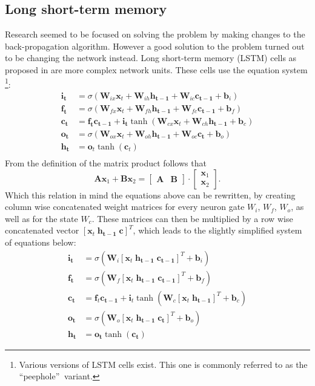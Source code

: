 \subsection{Long short-term memory}
Research seemed to be focused on solving the problem by making changes to the back-propagation algorithm. However a good solution to the problem turned out to
be changing the network instead. Long short-term memory (LSTM) cells as proposed in \cite{Hochreiter1995} are more complex network units.
These cells use the equation system \cite[page 5]{Graves2013}\footnote{ Various versions of LSTM cells exist. This one is commonly referred to as the \textquotedblleft peephole\textquotedblright $ \: $ variant. }:
\begin{align}
\mathbf{i_t} &= \sigma (\mathbf{W}_{ix} \mathbf{x}_t + \mathbf{W}_{ih} \mathbf{h_{t-1}} + \mathbf{W}_{ic} \mathbf{c_{t-1}} +\mathbf{ b}_i) \\
\mathbf{f_t} &= \sigma (\mathbf{W}_{fx} \mathbf{x}_t + \mathbf{W}_{fh} \mathbf{h_{t-1}} + \mathbf{W}_{fc} \mathbf{c_{t-1}} +\mathbf{ b}_f) \\
\mathbf{c_t} &= \mathbf{f_t} \mathbf{c_{t-1}} + \mathbf{i_t} \tanh( \mathbf{W}_{cx} \mathbf{x}_t + \mathbf{W}_{ch} \mathbf{h_{t-1}} + \mathbf{b}_c ) \\
\mathbf{o_t} &= \sigma (\mathbf{W}_{ox} \mathbf{x}_t + \mathbf{W}_{oh} \mathbf{h_{t-1}} + \mathbf{W}_{oc} \mathbf{c_t} + \mathbf{b}_o ) \\
\mathbf{h_t} &= \mathbf{o}_t \tanh(\mathbf{c}_t) \\
\end{align}
From the definition of the matrix product follows that
\begin{equation}
\mathbf{A}\mathbf{x}_1 + \mathbf{B}\mathbf{x}_2
=
\begin{bmatrix} \mathbf{A} & \mathbf{B} \end{bmatrix} \cdot
\begin{bmatrix} \mathbf{x}_1 \\ \mathbf{x}_2 \end{bmatrix}.
\end{equation}
Which this relation in mind the equations above can be rewritten, by creating column wise concatenated weight matrices for every neuron gate $W_i$, $W_f$, $W_o$, as well as for the state $W_c$. These matrices can then be multiplied by a row wise concatenated vector $[\mathbf{x}_t \; \mathbf{h_{t-1}} \; \mathbf{c}]^T$, which leads to the slightly simplified system of equations below:
\begin{align}
\mathbf{i_t} &= \sigma (\mathbf{W}_i [\mathbf{x}_t \; \mathbf{h_{t-1}} \; \mathbf{c_{t-1}}]^T + \mathbf{b}_i) \\
\mathbf{f_t} &= \sigma (\mathbf{W}_f [\mathbf{x}_t \; \mathbf{h_{t-1}} \; \mathbf{c_{t-1}}]^T + \mathbf{b}_f) \\
\mathbf{c_t} &= \mathbf{f}_t \mathbf{c_{t-1}} + \mathbf{i}_t \tanh( \mathbf{W}_c [\mathbf{x}_t \; \mathbf{h_{t-1}}]^T + \mathbf{b}_c ) \\
\mathbf{o_t} &= \sigma (\mathbf{W}_o [\mathbf{x}_t \; \mathbf{h_{t-1}} \; \mathbf{c_t}]^T + \mathbf{b}_o ) \\
\mathbf{h_t} &= \mathbf{o_t} \tanh(\mathbf{c_t})
\end{align}
